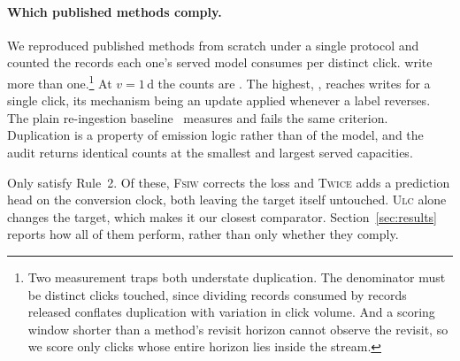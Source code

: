 \paragraph{Which published methods comply.}
We reproduced \nScreened{} published methods from scratch under a single protocol and counted
the records each one's served model consumes per distinct click. \nFail{} write more than
one.\footnote{Two measurement traps both understate duplication. The denominator must be
distinct clicks touched, since dividing records consumed by records released conflates
duplication with variation in click volume. And a scoring window shorter than a method's revisit
horizon cannot observe the revisit, so we score only clicks whose entire horizon lies inside the
stream.} At $v=1$\,d the counts are . The highest, \maxVisitsArm{},
reaches \maxVisits{} writes for a single click, its mechanism being an update applied whenever a
label reverses. The plain re-ingestion
baseline~\cite{ktena2019addressing,gu2021real} measures \vanillaDup{} and fails the same
criterion. Duplication is a property of emission logic rather than of the model, and the audit
returns identical counts at the smallest and largest served capacities.

Only \passList{} satisfy Rule~2. Of these, \textsc{Fsiw} corrects the loss and \textsc{Twice}
adds a prediction head on the conversion clock, both leaving the target itself untouched.
\textsc{Ulc} alone changes the target, which makes it our closest comparator. Section~\ref{sec:results}
reports how all of them perform, rather than only whether they comply.
